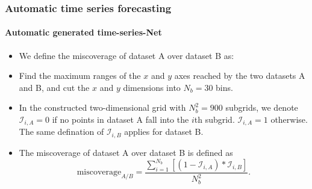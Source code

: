 \documentclass[10pt,aspectratio=43]{beamer}
\begin{document}
\begin{frame}
  \frametitle{Automatic time series forecasting}
  \framesubtitle{Automatic generated time-series-Net}


  \begin{itemize}
  \item   We define the miscoverage of dataset A over dataset B as:

  \item
    Find the maximum ranges of the \(x\) and \(y\) axes reached by the two
    datasets A and B, and cut the \(x\) and \(y\) dimensions into
    \(N_b = 30\) bins.
  \item
    In the constructed two-dimensional grid with \(N_b^2 = 900\) subgrids,
    we denote \(\mathcal{I}_{i,A} = 0\) if no points in dataset A fall
    into the \(i\)th subgrid. \(\mathcal{I}_{i,A} = 1\) otherwise. The
    same defination of \(\mathcal{I}_{i,B}\) applies for dataset B.
  \item
    The miscoverage of dataset A over dataset B is defined as
    \[\text{miscoverage}_{A/B} = \frac{\sum\limits_{i = 1}^{N_b}[(1 - \mathcal{I}_{i,A})*\mathcal{I}_{i,B}]}{N_b^2}.\]
  \end{itemize}

\end{frame}
\end{document}
